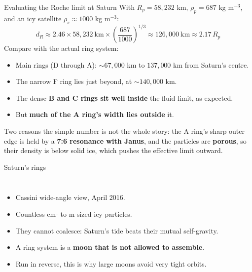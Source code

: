\documentclass[aspectratio=169, 11pt]{beamer}
\begin{document}
\begin{frame}{Evaluating the Roche limit at Saturn}
  With $R_p = 58{,}232$ km, $\rho_p = 687$ kg m$^{-3}$, and an icy satellite $\rho_s \approx 1000$ kg m$^{-3}$:
  \vskip4pt\relax
  \[
    d_R \approx 2.46 \times 58{,}232\ \mathrm{km} \times \left(\frac{687}{1000}\right)^{1/3}
    \approx 126{,}000\ \mathrm{km} \approx 2.17\, R_p
  \]
  \vskip6pt\relax
  Compare with the actual ring system:
  \begin{itemize}
    \item Main rings (D through A): $\sim 67{,}000$ km to $137{,}000$ km from Saturn's centre.
    \item The narrow F ring lies just beyond, at $\sim 140{,}000$ km.
    \item The dense \textbf{B and C rings sit well inside} the fluid limit, as expected.
    \item But \textbf{much of the A ring's width lies outside} it.
  \end{itemize}
  \vskip4pt\relax
  Two reasons the simple number is not the whole story: the A ring's sharp outer edge is held by a \textbf{7:6 resonance with Janus}, and the particles are \textbf{porous}, so their density is below solid ice, which pushes the effective limit outward.
\end{frame}

\begin{frame}{Saturn's rings}
  \begin{columns}[c]
    \column{\recapfigcol}
    \centering

    \column{\recaptextcol}
    \begin{itemize}
      \item Cassini wide-angle view, April 2016.
      \item Countless cm- to m-sized icy particles.
      \item They cannot coalesce: Saturn's tide beats their mutual self-gravity.
      \item A ring system is a \textbf{moon that is not allowed to assemble}.
      \item Run in reverse, this is why large moons avoid very tight orbits.
    \end{itemize}
  \end{columns}
\end{frame}
\end{document}
